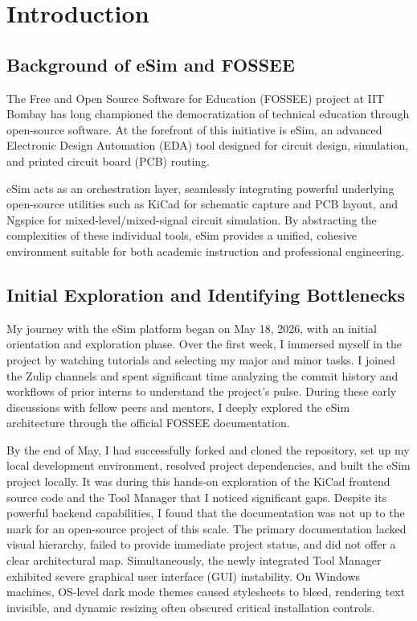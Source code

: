 \documentclass[12pt,a4paper]{report}
\begin{document}
\chapter{Introduction}
\section{Background of eSim and FOSSEE}
The Free and Open Source Software for Education (FOSSEE) project at IIT Bombay has long championed the democratization of technical education through open-source software. At the forefront of this initiative is eSim, an advanced Electronic Design Automation (EDA) tool designed for circuit design, simulation, and printed circuit board (PCB) routing.

eSim acts as an orchestration layer, seamlessly integrating powerful underlying open-source utilities such as KiCad for schematic capture and PCB layout, and Ngspice for mixed-level/mixed-signal circuit simulation. By abstracting the complexities of these individual tools, eSim provides a unified, cohesive environment suitable for both academic instruction and professional engineering.

\section{Initial Exploration and Identifying Bottlenecks}
My journey with the eSim platform began on May 18, 2026, with an initial orientation and exploration phase. Over the first week, I immersed myself in the project by watching tutorials and selecting my major and minor tasks. I joined the Zulip channels and spent significant time analyzing the commit history and workflows of prior interns to understand the project's pulse. During these early discussions with fellow peers and mentors, I deeply explored the eSim architecture through the official FOSSEE documentation. 

By the end of May, I had successfully forked and cloned the repository, set up my local development environment, resolved project dependencies, and built the eSim project locally. It was during this hands-on exploration of the KiCad frontend source code and the Tool Manager that I noticed significant gaps. Despite its powerful backend capabilities, I found that the documentation was not up to the mark for an open-source project of this scale. The primary documentation lacked visual hierarchy, failed to provide immediate project status, and did not offer a clear architectural map. Simultaneously, the newly integrated Tool Manager exhibited severe graphical user interface (GUI) instability. On Windows machines, OS-level dark mode themes caused stylesheets to bleed, rendering text invisible, and dynamic resizing often obscured critical installation controls.
\end{document}
